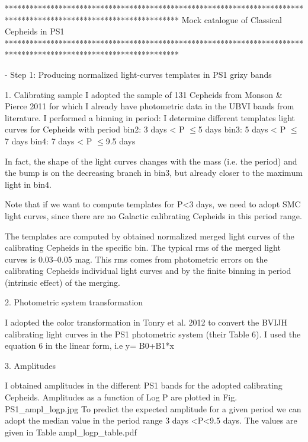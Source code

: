 ******************************************************************************************************************
Mock catalogue of Classical Cepheids in PS1
******************************************************************************************************************

- Step 1: Producing normalized light-curves templates in PS1 grizy bands

        1. Calibrating sample
            I adopted the sample of 131 Cepheids from Monson & Pierce 2011 for which I already have photometric data
            in the UBVI bands from literature.
            I performed a binning in period: I determine different templates light curves
            for Cepheids with period
            bin2:  3 days < P $\leqslant$5 days 
            bin3:  5 days < P $\leqslant$7 days 
            bin4:  7 days < P $\leqslant$9.5 days 
            
            In fact, the shape of the light curves changes with the mass (i.e. the period) 
            and the bump is on the decreasing branch in bin3, but already
            closer to the maximum light in bin4.
            
            Note that if we want to compute templates for P<3 days,
            we need to adopt SMC light curves, since there are no Galactic
            calibrating Cepheids in this period range.
            
            The templates are computed by obtained normalized merged light curves
            of the calibrating Cepheids in the specific bin.
            The typical rms of the merged light curves is 0.03--0.05 mag.
            This rms comes from photometric errors on the 
            calibrating Cepheids individual light curves and by the finite binning in period
            (intrinsic effect) of the merging.
            
        2. Photometric system transformation
        
            I adopted the color transformation in Tonry et al. 2012 to convert the 
            BVIJH calibrating light curves in the PS1 photometric system (their Table 6).
            I used the equation 6 in the linear form, i.e y= B0+B1*x
        
        
        3. Amplitudes
        
            I obtained amplitudes in the different PS1 bands for the adopted calibrating Cepheids.
            Amplitudes as a function of Log P are plotted in Fig. PS1_ampl_logp.jpg 
            To predict the expected amplitude for a given period 
            we can adopt the median value in the period range 3 days <P<9.5 days.
            The values are given in Table ampl_logp_table.pdf
            
